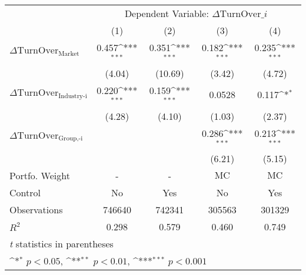 {
\def\sym#1{\ifmmode^{#1}\else\(^{#1}\)\fi}
\begin{tabular}{l*{4}{c}}
\hline\hline
                    &\multicolumn{4}{c}{Dependent Variable: $\Delta \text{TurnOver}\_{i} $ }                 \\\cmidrule(lr){2-5}
                    &\multicolumn{1}{c}{(1)}         &\multicolumn{1}{c}{(2)}         &\multicolumn{1}{c}{(3)}         &\multicolumn{1}{c}{(4)}         \\
\hline
 $ \Delta \text{TurnOver}_{\text{Market}} $ &       0.457\sym{***}&       0.351\sym{***}&       0.182\sym{***}&       0.235\sym{***}\\
                    &      (4.04)         &     (10.69)         &      (3.42)         &      (4.72)         \\
[1em]
 $ \Delta \text{TurnOver}_{\text{Industry-i}} $ &       0.220\sym{***}&       0.159\sym{***}&      0.0528         &       0.117\sym{*}  \\
                    &      (4.28)         &      (4.10)         &      (1.03)         &      (2.37)         \\
[1em]
 $ \Delta \text{TurnOver}_{\text{Group,-i}} $ &                     &                     &       0.286\sym{***}&       0.213\sym{***}\\
                    &                     &                     &      (6.21)         &      (5.15)         \\
\hline
Portfo. Weight      &           -         &           -         & $ \text{MC} $          & $ \text{MC} $          \\
Control             &          No         &         Yes         &          No         &         Yes         \\
Observations        &      746640         &      742341         &      305563         &      301329         \\
$ R^2 $             &       0.298         &       0.579         &       0.460         &       0.749         \\
\hline\hline
\multicolumn{5}{l}{\footnotesize \textit{t} statistics in parentheses}\\
\multicolumn{5}{l}{\footnotesize \sym{*} \(p<0.05\), \sym{**} \(p<0.01\), \sym{***} \(p<0.001\)}\\
\end{tabular}
}
